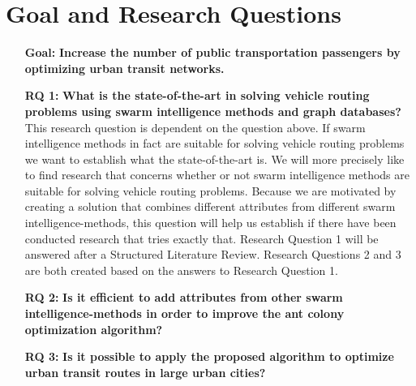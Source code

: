 \section{Goal and Research Questions}

\begin{itemize}
\item[\textbf{Goal:}] \label{itm:goal} \textbf{Increase the number of public transportation passengers by optimizing urban transit networks.}
\end{itemize}

\begin{itemize}

    \item[\textbf{RQ 1:}]\label{itm:RQ1} \textbf{What is the state-of-the-art in solving vehicle routing problems using swarm intelligence methods and graph databases?}
    \newline
    This research question is dependent on the question above. If swarm intelligence methods in fact are suitable for solving vehicle routing problems we want to establish what the state-of-the-art is.
    We will more precisely like to find research that concerns whether or not swarm intelligence methods are suitable for solving vehicle routing problems. Because we are motivated by creating a solution that combines different attributes from different swarm intelligence-methods, this question will help us establish if there have been conducted research that tries exactly that. 
    Research Question 1 will be answered after a Structured Literature Review\citep{kofod2014}. Research Questions 2 and 3 are both created based on the answers to Research Question 1. 

    \item[\textbf{RQ 2:}]\label{itm:RQ2} \textbf{Is it efficient to add attributes from other swarm intelligence-methods in order to improve the ant colony optimization algorithm?}

    \item[\textbf{RQ 3:}]\label{itm:RQ3}\textbf{Is it possible to apply the proposed algorithm to optimize urban transit routes in large urban cities?}

\end{itemize}



